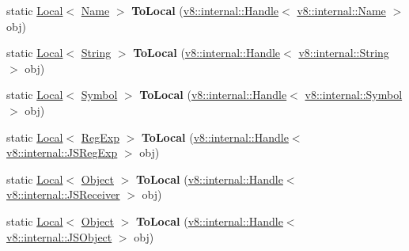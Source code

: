 \begin{DoxyCompactItemize}
\item 
static \hyperlink{classv8_1_1_local}{Local}$<$ \hyperlink{classv8_1_1_name}{Name} $>$ {\bfseries To\+Local} (\hyperlink{classv8_1_1internal_1_1_handle}{v8\+::internal\+::\+Handle}$<$ \hyperlink{classv8_1_1internal_1_1_name}{v8\+::internal\+::\+Name} $>$ obj)\hypertarget{classv8_1_1_utils_a0c902a0bb82752d5be5c426394b77c5c}{}\label{classv8_1_1_utils_a0c902a0bb82752d5be5c426394b77c5c}

\item 
static \hyperlink{classv8_1_1_local}{Local}$<$ \hyperlink{classv8_1_1_string}{String} $>$ {\bfseries To\+Local} (\hyperlink{classv8_1_1internal_1_1_handle}{v8\+::internal\+::\+Handle}$<$ \hyperlink{classv8_1_1internal_1_1_string}{v8\+::internal\+::\+String} $>$ obj)\hypertarget{classv8_1_1_utils_a542c00f40ca2110234f8af6347c18226}{}\label{classv8_1_1_utils_a542c00f40ca2110234f8af6347c18226}

\item 
static \hyperlink{classv8_1_1_local}{Local}$<$ \hyperlink{classv8_1_1_symbol}{Symbol} $>$ {\bfseries To\+Local} (\hyperlink{classv8_1_1internal_1_1_handle}{v8\+::internal\+::\+Handle}$<$ \hyperlink{classv8_1_1internal_1_1_symbol}{v8\+::internal\+::\+Symbol} $>$ obj)\hypertarget{classv8_1_1_utils_a8f80a73e8cb52ce4ce60582f20066656}{}\label{classv8_1_1_utils_a8f80a73e8cb52ce4ce60582f20066656}

\item 
static \hyperlink{classv8_1_1_local}{Local}$<$ \hyperlink{classv8_1_1_reg_exp}{Reg\+Exp} $>$ {\bfseries To\+Local} (\hyperlink{classv8_1_1internal_1_1_handle}{v8\+::internal\+::\+Handle}$<$ \hyperlink{classv8_1_1internal_1_1_j_s_reg_exp}{v8\+::internal\+::\+J\+S\+Reg\+Exp} $>$ obj)\hypertarget{classv8_1_1_utils_addc955f726ea1afd17380844f36d92c7}{}\label{classv8_1_1_utils_addc955f726ea1afd17380844f36d92c7}

\item 
static \hyperlink{classv8_1_1_local}{Local}$<$ \hyperlink{classv8_1_1_object}{Object} $>$ {\bfseries To\+Local} (\hyperlink{classv8_1_1internal_1_1_handle}{v8\+::internal\+::\+Handle}$<$ \hyperlink{classv8_1_1internal_1_1_j_s_receiver}{v8\+::internal\+::\+J\+S\+Receiver} $>$ obj)\hypertarget{classv8_1_1_utils_af30171d690a28bc7261257e417396198}{}\label{classv8_1_1_utils_af30171d690a28bc7261257e417396198}

\item 
static \hyperlink{classv8_1_1_local}{Local}$<$ \hyperlink{classv8_1_1_object}{Object} $>$ {\bfseries To\+Local} (\hyperlink{classv8_1_1internal_1_1_handle}{v8\+::internal\+::\+Handle}$<$ \hyperlink{classv8_1_1internal_1_1_j_s_object}{v8\+::internal\+::\+J\+S\+Object} $>$ obj)\hypertarget{classv8_1_1_utils_a7e6956f478d4f7e0dce5986a422d1554}{}\label{classv8_1_1_utils_a7e6956f478d4f7e0dce5986a422d1554}


\end{DoxyCompactItemize}
